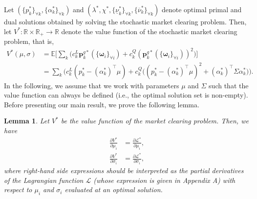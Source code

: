 \documentclass{article}
\newtheorem{lemma}{Lemma}
\begin{document}
Let $(\{p_k^*\}_{\forall k}, \{\alpha_k^*\}_{\forall k})$ and $(\lambda^*, \chi^*, \{\underline{\nu}_k^*\}_{\forall k}, \{\overline{\nu}_k^*\}_{\forall k})$ denote optimal primal and dual solutions obtained by solving the stochastic market clearing problem. Then, let $V^*: \mathbb{R} \times \mathbb{R}_+ \rightarrow \mathbb{R}$ denote the value function of the stochastic market clearing problem, that is, 
\begin{align*}
V^*(\mu, \sigma) &= \mathbb{E}\Big[\sum_k \big(c_k^L \mathbf{p}_k^{g*}(\{\boldsymbol{\omega}_i\}_{\forall i}) + c_k^Q (\mathbf{p}_k^{g*}(\{\boldsymbol{\omega}_i\}_{\forall i}))^2\big)\Big]\\
 &= \sum_k \Big(c_k^L(p_k^* - (\alpha_k^*)^\top \mu) + c_k^Q \big((p_k^* - (\alpha_k^*)^\top \mu)^2 + (\alpha_k^*)^\top \Sigma \alpha_k^* \big)\Big).
\end{align*}
In the following, we assume that we work with parameters $\mu$ and $\Sigma$ such that the value function can always be defined (i.e., the optimal solution set is non-empty). Before presenting our main result, we prove the following lemma.
\begin{lemma}\label{lemma1}
Let $V^*$ be the value function of the market clearing problem. Then, we have
\begin{align*}
\frac{\partial V^*}{\partial \mu_i} &= \frac{\partial \mathcal{L}^*}{\partial \mu_i},\\
\frac{\partial V^*}{\partial \sigma_i} &= \frac{\partial \mathcal{L}^*}{\partial \sigma_i},
\end{align*}
where right-hand side expressions should be interpreted as the partial derivatives of the Lagrangian function $\mathcal{L}$ (whose expression is given in Appendix A) with respect to $\mu_i$ and $\sigma_i$ evaluated at an optimal solution.
\end{lemma}
\end{document}
